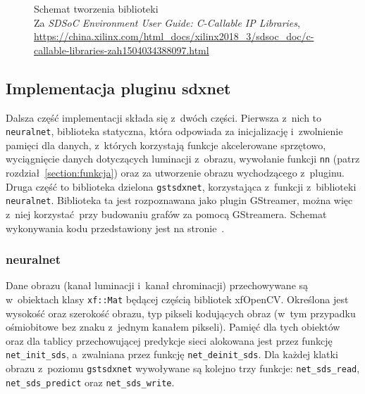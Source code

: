 \documentclass[12pt, oneside, a4paper]{article}
\begin{document}
\begin{figure}[h]
  \centering
  
  \caption{Schemat tworzenia biblioteki \\
  Za \textit{SDSoC Environment User Guide: C-Callable IP Libraries},
  \url{https://china.xilinx.com/html_docs/xilinx2018_3/sdsoc_doc/c-callable-libraries-zah1504034388097.html}}\label{fig:ccallable}
\end{figure}

\newpage
\subsection{Implementacja pluginu sdxnet}\label{sec:Implementacja pluginu sdxnet}

Dalsza część implementacji składa się z~dwóch części.
Pierwsza z~nich to \lstinline{neuralnet}, biblioteka statyczna, która
odpowiada za inicjalizację i~zwolnienie pamięci dla danych, z~których
korzystają funkcje akcelerowane sprzętowo,
wyciągnięcie danych dotyczących luminacji z~obrazu,
wywołanie funkcji \lstinline{nn} (patrz rozdział~\ref{section:funkcja}) oraz
za utworzenie obrazu wychodzącego z~pluginu.
Druga część to biblioteka dzielona \lstinline{gstsdxnet}, korzystająca
z~funkcji z~biblioteki \lstinline{neuralnet}. Biblioteka ta jest rozpoznawana
jako plugin GStreamer, można więc z~niej korzystać przy budowaniu
grafów za pomocą GStreamera. Schemat wykonywania kodu przedstawiony jest
na stronie~\pageref{appendix:code-scheme}.

\subsubsection{neuralnet}\label{sec:neuralnet}
Dane obrazu (kanał luminacji i~kanał chrominacji)
przechowywane są w~obiektach klasy \lstinline{xf::Mat} będącej
częścią bibliotek xfOpenCV. Określona jest wysokość oraz szerokość obrazu,
typ pikseli kodujących obraz (w~tym przypadku ośmiobitowe bez znaku
z~jednym kanałem pikseli). Pamięć dla tych obiektów oraz dla tablicy
przechowującej predykcje sieci alokowana jest przez
funkcję \lstinline{net_init_sds}, a~zwalniana przez funkcję
\lstinline{net_deinit_sds}. Dla każdej klatki obrazu z~poziomu
\lstinline{gstsdxnet} wywoływane są kolejno trzy funkcje:
\lstinline{net_sds_read},
\lstinline{net_sds_predict} oraz
\lstinline{net_sds_write}.
\end{document}
